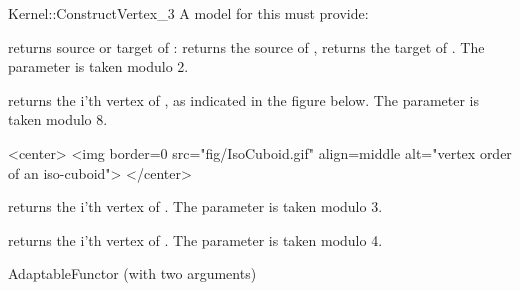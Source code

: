 \begin{ccRefFunctionObjectConcept}{Kernel::ConstructVertex_3}
A model for this must provide:


 {returns source or target of : \ccVar{}
  returns the source of , \ccVar{} returns the target
  of . The parameter  is taken modulo 2. }

 {returns the i'th vertex of
  , as indicated in the figure below. The parameter  is
  taken modulo 8. 
  }

\begin{ccHtmlOnly}
<center>
<img border=0 src="fig/IsoCuboid.gif" align=middle 
  alt="vertex order of an iso-cuboid">
</center>
\end{ccHtmlOnly} 

 {returns the i'th vertex of . The parameter
   is taken modulo 3.}

 {returns the i'th vertex of
  . The parameter  is taken modulo 4.}

\ccRefines
AdaptableFunctor (with two arguments)

\ccSeeAlso
{} \\
 \\
  \\
 \\

\end{ccRefFunctionObjectConcept}
